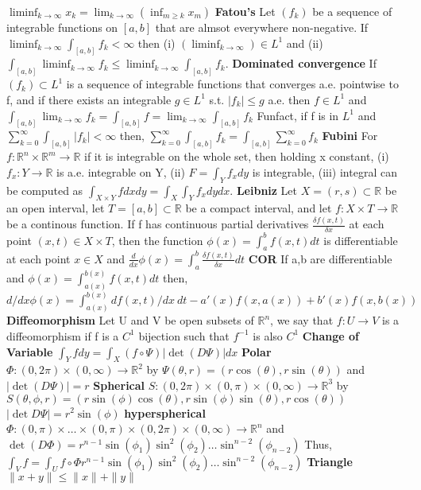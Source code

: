 \documentclass[8pt]{extarticle}
\theoremstyle{definition}
\begin{document}
$\liminf_{k \to \infty} x_k = \lim_{k \to \infty}(\inf_{m \geq k}x_m)$
\textbf{Fatou's} Let $(f_k)$ be a sequence of integrable functions on $[a,b]$ that are almsot everywhere non-negative. If $\liminf_{k \to \infty} \int _{[a,b]} f_k < \infty$ then (i) $(\liminf_{k \to \infty}) \in L^1$ and (ii) $\int_{[a,b]} \liminf_{k \to \infty} f_k \leq \liminf_{k \to \infty} \int _{[a,b]} f_k$.
\textbf{Dominated convergence} If $(f_k) \subset L^1$ is a sequence of integrable functions that converges a.e. pointwise to f, and if there exists an 
integrable $g\in L^1$ s.t. $|f_k| \leq g$ a.e. then $f \in L^1$ and $\int_{[a,b]} \lim_{k \to \infty} f_k = \int_{[a,b]} f = \lim_{k \to \infty} \int_{[a,b]} f_k$
Funfact, if f is in $L^1$ and $\sum^\infty_{k=0}\int_{[a,b]}|f_k| < \infty$ then, $\sum^\infty_{k=0}\int_{[a,b]}f_k = \int_{[a,b]}\sum^\infty_{k=0}f_k$
\textbf{Fubini} For $f: \mathbb{R}^n \times \mathbb{R}^m \to \mathbb{R}$ if it is integrable on the whole set, then holding x constant, (i) $f_x:Y\to \mathbb{R}$ is a.e. integrable on Y, (ii) $F = \int_Y f_x dy$ is integrable, (iii) integral can be computed as $\int_{X\times Y} f dx dy = \int_X \int_Y f_x dy dx$.
\textbf{Leibniz} Let $ X = (r,s) \subset \mathbb{R}$ be an open interval, let $T = [a,b] \subset \mathbb{R}$ be a compact interval, and let $f:X \times T \to \mathbb{R}$ be a continous function. If f has continuous partial derivatives $\frac{\delta f(x,t)}{\delta x}$ at each point $(x,t) \in X \times T$, then the function $\phi(x) = \int_a^b f(x,t) dt$ is differentiable at each point $x \in X$ and $\frac{d}{dx}\phi(x) = \int ^b_a \frac{\delta f(x,t)}{\delta x}dt$
\textbf{COR} If a,b are differentiable and $\phi(x) = \int_{a(x)}^{b(x)} f(x,t) dt$ then, $d/dx \phi(x) = \int^{b(x)}_{a(x)} df(x,t)/dx~dt - a'(x)f(x,a(x)) + b'(x)f(x,b(x))$
\textbf{Diffeomorphism} Let U and V be open subsets of $\mathbb{R}^n$, we say that $f:U \to V$ is a diffeomorphism if f is a $C^1$ bijection such that $f^{-1}$ is also $C^1$
\textbf{Change of Variable} $\int_Y f dy = \int _X (f \circ \Psi)|\det(D\Psi)|dx$
\textbf{Polar} $\Phi: (0, 2\pi) \times (0, \infty) \to \mathbb{R}^2$ by $\Psi(\theta, r) = (r\cos(\theta), r\sin(\theta))$ and  $|\det(D\Psi)| = r$
\textbf{Spherical} $S: (0,2\pi) \times (0,\pi) \times (0, \infty) \to \mathbb{R}^3$ by $S(\theta, \phi, r) = (r \sin(\phi)\cos(\theta), r \sin(\phi)\sin(\theta), r\cos(\theta))$
$|\det D\Psi| = r^2 \sin(\phi)$
\textbf{hyperspherical} $\Phi: (0,\pi) \times \dots \times (0,\pi) \times (0,2\pi) \times (0, \infty) \to \mathbb{R}^n$ and $\det (D\Phi) = r^{n-1}\sin(\phi_1)\sin^2(\phi_2)\dots\sin^{n-2}(\phi_{n-2})$ Thus, $\int_V f = \int_U f \circ \Phi r^{n-1}\sin(\phi_1)\sin^2(\phi_2)\dots\sin^{n-2}(\phi_{n-2})$
\textbf{Triangle}$\|x+y\| \leq \|x\| + \|y\|$
\end{document}

